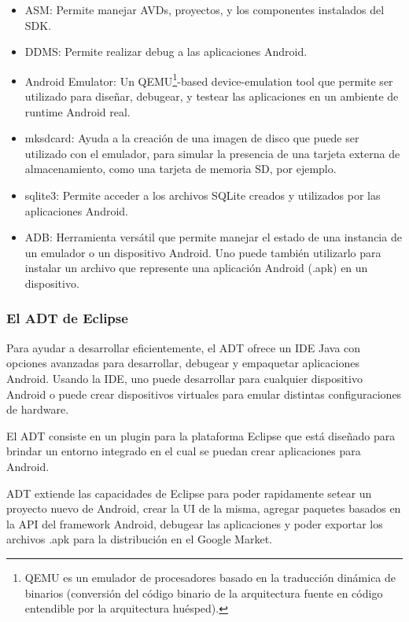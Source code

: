 \begin{itemize}
\item \acf{ASM}: Permite manejar \ac{AVD}s, proyectos, y los componentes instalados del \ac{SDK}.
\item \acf{DDMS}: Permite realizar debug a las aplicaciones Android.
\item Android Emulator: Un QEMU\footnote{QEMU es un emulador de procesadores basado en la traducci\'on din\'amica de binarios (conversi\'on del c\'odigo binario de la arquitectura fuente en c\'odigo entendible por la arquitectura hu\'esped).}-based device-emulation tool que permite ser utilizado para dise\~nar, debugear, y testear las aplicaciones en un ambiente de runtime Android real.
\item mksdcard: Ayuda a la creaci\'on de una imagen de disco que puede ser utilizado con el emulador, para simular la presencia de una tarjeta externa de almacenamiento, como una tarjeta de memoria \ac{SD}, por ejemplo.
\item sqlite3: Permite acceder a los archivos SQLite creados y utilizados por las aplicaciones Android.
\item \ac{ADB}: Herramienta vers\'atil que permite manejar el estado de una instancia de un emulador o un dispositivo Android. Uno puede tambi\'en utilizarlo para instalar un archivo que represente una aplicaci\'on Android (.apk) en un dispositivo.
\end{itemize}

\subsubsection{El \acf{ADT} de Eclipse}
\label{subsubsec:android.tools.adt.1}

Para ayudar a desarrollar eficientemente, el \ac{ADT} ofrece un \ac{IDE} Java con opciones avanzadas para desarrollar, debugear y empaquetar aplicaciones Android. Usando la \ac{IDE}, uno puede desarrollar para cualquier dispositivo Android o puede crear dispositivos virtuales para emular distintas configuraciones de hardware.

El \ac{ADT} consiste en un plugin para la plataforma Eclipse\Si{\texttrademark} que est\'a dise\~nado para brindar un entorno integrado en el cual se puedan crear aplicaciones para Android.

\ac{ADT} extiende las capacidades de Eclipse\Si{\texttrademark} para poder rapidamente setear un proyecto nuevo de Android, crear la \ac{UI} de la misma, agregar paquetes basados en la \ac{API} del framework Android, debugear las aplicaciones y poder exportar los archivos .apk para la distribuci\'on en el Google Market\Si{\texttrademark}.~\cite{and.dev.adt}

